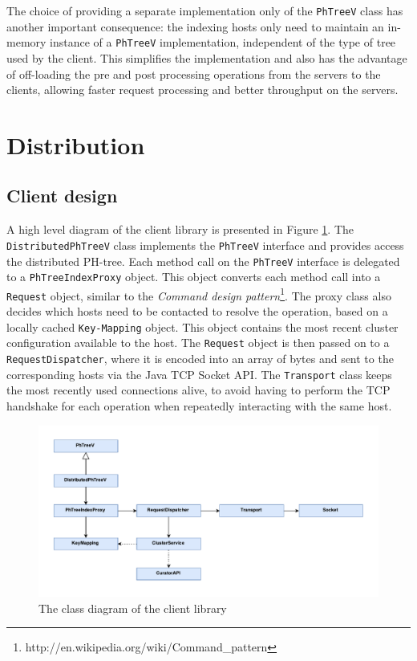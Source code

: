 \documentclass[11pt,a4paper]{globis-book}
\begin{document}
The choice of providing a separate implementation only of the \texttt{PhTreeV} class has another important consequence: the indexing hosts only need to maintain an in-memory instance of a \texttt{PhTreeV} implementation, independent of the type of tree used by the client. This simplifies the implementation and also has the advantage of off-loading the pre and post processing operations from the servers to the clients, allowing faster request processing and better throughput on the servers. 

\section{Distribution}

\subsection{Client design}

A high level diagram of the client library is presented in Figure \ref{fig:Client-library}. The \texttt{DistributedPhTreeV} class implements the \texttt{PhTreeV} interface and provides access the distributed PH-tree. Each method call on the \texttt{PhTreeV} interface is delegated to a \texttt{PhTreeIndexProxy} object. This object converts each method call into a \texttt{Request} object, similar to the \textit{Command design pattern}\footnote{http://en.wikipedia.org/wiki/Command\_pattern}. The proxy class also decides which hosts need to be contacted to resolve the operation, based on a locally cached \texttt{Key-Mapping} object. This object contains the most recent cluster configuration available to the host. The \texttt{Request} object is then passed on to a \texttt{RequestDispatcher}, where it is encoded into an array of bytes and sent to the corresponding hosts via the Java TCP Socket API. The \texttt{Transport} class keeps the most recently used connections alive, to avoid having to perform the TCP handshake for each operation when repeatedly interacting with the same host. 

\begin{figure}[h]
    \centering 
    \includegraphics[scale=0.9]{images/Client}
    \caption{The class diagram of the client library}
    \label{fig:Client-library}
\end{figure}
\end{document}
